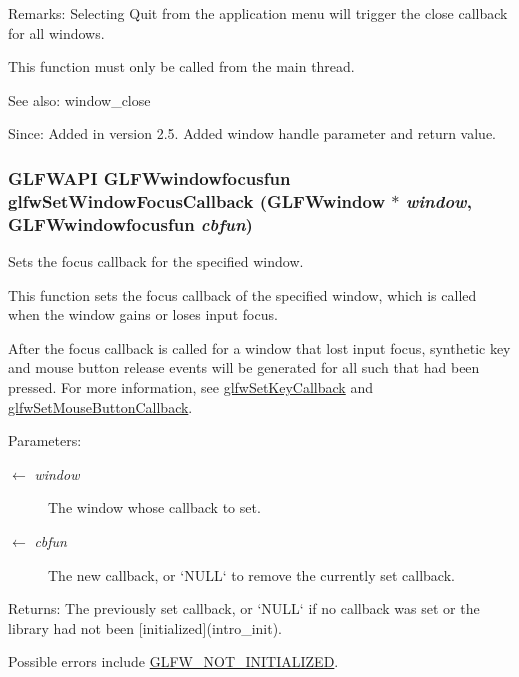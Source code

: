 \begin{Desc}
\item[Remarks:]Selecting Quit from the application menu will trigger the close callback for all windows.\end{Desc}
This function must only be called from the main thread.

\begin{Desc}
\item[See also:]window\_\-close\end{Desc}
\begin{Desc}
\item[Since:]Added in version 2.5.  Added window handle parameter and return value. \end{Desc}
\hypertarget{group__window_gc89c6534ba7fbab6f6c68b855656c0d4}{
\subsubsection[glfwSetWindowFocusCallback]{\setlength{\rightskip}{0pt plus 5cm}GLFWAPI {\bf GLFWwindowfocusfun} glfwSetWindowFocusCallback ({\bf GLFWwindow} $\ast$ {\em window}, \/  {\bf GLFWwindowfocusfun} {\em cbfun})}}
\label{group__window_gc89c6534ba7fbab6f6c68b855656c0d4}


Sets the focus callback for the specified window. 

This function sets the focus callback of the specified window, which is called when the window gains or loses input focus.

After the focus callback is called for a window that lost input focus, synthetic key and mouse button release events will be generated for all such that had been pressed. For more information, see \hyperlink{group__input_ga73bb92f628a2a0be9c132d56f19362c}{glfwSetKeyCallback} and \hyperlink{group__input_g20e5ba1ce4e086aedd48a06dc311c95f}{glfwSetMouseButtonCallback}.

\begin{Desc}
\item[Parameters:]
\begin{description}
\item[\mbox{$\leftarrow$} {\em window}]The window whose callback to set. \item[\mbox{$\leftarrow$} {\em cbfun}]The new callback, or `NULL` to remove the currently set callback. \end{description}
\end{Desc}
\begin{Desc}
\item[Returns:]The previously set callback, or `NULL` if no callback was set or the library had not been \mbox{[}initialized\mbox{]}(intro\_\-init).\end{Desc}
Possible errors include \hyperlink{group__errors_g2374ee02c177f12e1fa76ff3ed15e14a}{GLFW\_\-NOT\_\-INITIALIZED}.

